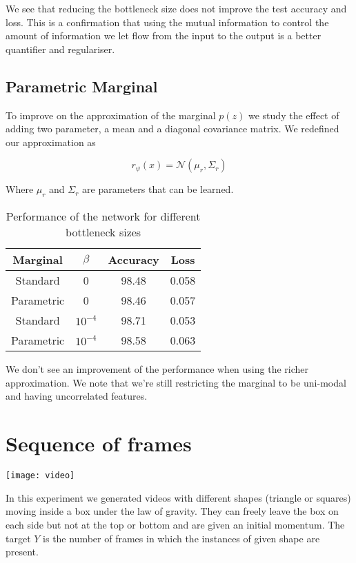 \documentclass[11pt,oneside,openright]{report}
\begin{document}
We see that reducing the bottleneck size does not improve the test accuracy and loss. This is a confirmation that using the mutual information to control the amount of information we let flow from the input to the output is a better quantifier and regulariser.

\subsection{Parametric Marginal}
To improve on the approximation of the marginal $p(z)$ we study the effect of adding two parameter, a mean and a diagonal covariance matrix. We redefined our approximation as

$$r_\psi(x) = \mathcal{N}(\mu_r, \Sigma_r)$$ 

Where $\mu_r$ and $\Sigma_r$ are parameters that can be learned. 

\begin {table}[H]
\begin{center}
\begin{tabular}{ c  c| c c }
 Marginal & $\beta$ & Accuracy & Loss \\
 \hline
Standard &  0 & 98.48 & 0.058 \\
Parametric & 0 & 98.46 & 0.057 \\
Standard &  $10^{-4}$ & 98.71 & 0.053 \\
Parametric & $10^{-4}$ & 98.58 & 0.063 \\
\end{tabular}
\end{center}
\caption{Performance of the network for different bottleneck sizes}
\end {table}

We don't see an improvement of the performance when using the richer approximation. We note that we're still restricting the marginal to be uni-modal and having uncorrelated features.

\section{Sequence of frames}

\begin{center}
\texttt{[image: video]}
\end{center}

In this experiment we generated videos with different shapes (triangle or squares) moving inside a box under the law of gravity. They can freely leave the box on each side but not at the top or bottom and are given an initial momentum. The target $Y$ is the number of frames in which the instances of given shape are present.
\end{document}
